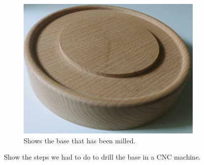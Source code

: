\documentclass[04.3_buildingProcess.tex]{subfiles}
\begin{document}
\begin{flushleft}
\begin{figure}[H]
\begin{subfigure}{.45\textwidth}
                \includegraphics[scale=0.05]{images/materialProcess/base.jpg}
                \caption{Shows the base that has been milled.}
                \label{fig:blossomBase}
                \vspace{6mm}
            \end{subfigure}
            \caption{Show the steps we had to do to drill the base in a CNC machine.}
            \label{fig:laserCutTests}
        \end{figure}
    \end{flushleft}
\end{document}
